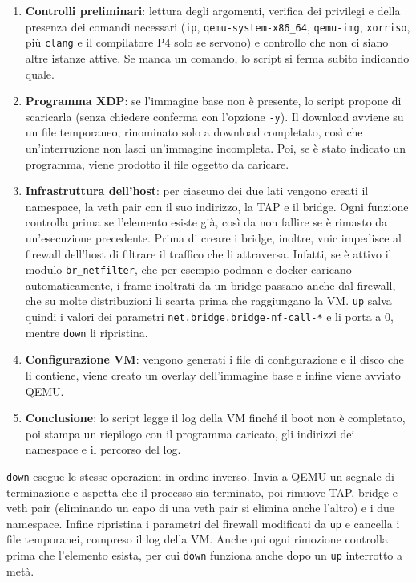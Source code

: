 \begin{enumerate}
    \item \textbf{Controlli preliminari}: lettura degli argomenti, verifica dei privilegi e della presenza dei comandi necessari (\texttt{ip}, \texttt{qemu-system-x86\_64}, \texttt{qemu-img}, \texttt{xorriso}, più \texttt{clang} e il compilatore P4 solo se servono) e controllo che non ci siano altre istanze attive. Se manca un comando, lo script si ferma subito indicando quale.
    \item \textbf{Programma XDP}: se l'immagine base non è presente, lo script propone di scaricarla (senza chiedere conferma con l'opzione \texttt{-y}). Il download avviene su un file temporaneo, rinominato solo a download completato, così che un'interruzione non lasci un'immagine incompleta. Poi, se è stato indicato un programma, viene prodotto il file oggetto da caricare.
    \item \textbf{Infrastruttura dell'host}: per ciascuno dei due lati vengono creati il namespace, la veth pair con il suo indirizzo, la TAP e il bridge. Ogni funzione controlla prima se l'elemento esiste già, così da non fallire se è rimasto da un'esecuzione precedente. Prima di creare i bridge, inoltre, vnic impedisce al firewall dell'host di filtrare il traffico che li attraversa. Infatti, se è attivo il modulo \texttt{br\_netfilter}, che per esempio podman e docker caricano automaticamente, i frame inoltrati da un bridge passano anche dal firewall, che su molte distribuzioni li scarta prima che raggiungano la VM. \texttt{up} salva quindi i valori dei parametri \texttt{net.bridge.bridge-nf-call-*} e li porta a 0, mentre \texttt{down} li ripristina.
    \item \textbf{Configurazione VM}: vengono generati i file di configurazione e il disco che li contiene, viene creato un overlay dell'immagine base e infine viene avviato QEMU.
    \item \textbf{Conclusione}: lo script legge il log della VM finché il boot non è completato, poi stampa un riepilogo con il programma caricato, gli indirizzi dei namespace e il percorso del log.
\end{enumerate}

\texttt{down} esegue le stesse operazioni in ordine inverso. Invia a QEMU un segnale di terminazione e aspetta che il processo sia terminato, poi rimuove TAP, bridge e veth pair (eliminando un capo di una veth pair si elimina anche l'altro) e i due namespace. Infine ripristina i parametri del firewall modificati da \texttt{up} e cancella i file temporanei, compreso il log della VM. Anche qui ogni rimozione controlla prima che l'elemento esista, per cui \texttt{down} funziona anche dopo un \texttt{up} interrotto a metà.

